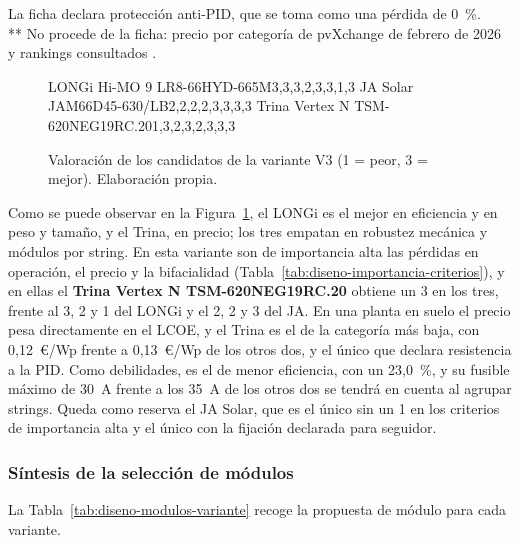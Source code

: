 \begin{table}[htbp]
    \smallskip
    {\scriptsize * La ficha declara protección anti-PID, que se toma como una pérdida de 0~\%.\\ ** No procede de la ficha: precio por categoría de pvXchange de febrero de 2026 \cite{PvXchangePrecios2026} y rankings consultados \cite{CleanEnergyReviews2025,BlackRidge2025}.}
\end{table}

\begin{figure}[htbp]
    \centering
        {LONGi Hi-MO 9 LR8-66HYD-665M}{3,3,3,2,3,3,1,3}
        {JA Solar JAM66D45-630/LB}{2,2,2,2,3,3,3,3}
        {Trina Vertex N TSM-620NEG19RC.20}{1,3,2,3,2,3,3,3}
    \caption{Valoración de los candidatos de la variante V3 (1 = peor, 3 = mejor). Elaboración propia.}
    \label{fig:radar-v3}
\end{figure}

Como se puede observar en la Figura~\ref{fig:radar-v3}, el LONGi es el mejor en eficiencia y en peso y tamaño, y el Trina, en precio; los tres empatan en robustez mecánica y módulos por string. En esta variante son de importancia alta las pérdidas en operación, el precio y la bifacialidad (Tabla~\ref{tab:diseno-importancia-criterios}), y en ellas el \textbf{Trina Vertex N TSM-620NEG19RC.20} obtiene un 3 en los tres, frente al 3, 2 y 1 del LONGi y el 2, 2 y 3 del JA. En una planta en suelo el precio pesa directamente en el \ac{LCOE}, y el Trina es el de la categoría más baja, con 0,12~€/Wp frente a 0,13~€/Wp de los otros dos, y el único que declara resistencia a la PID. Como debilidades, es el de menor eficiencia, con un 23,0~\%, y su fusible máximo de 30~A frente a los 35~A de los otros dos se tendrá en cuenta al agrupar strings. Queda como reserva el JA Solar, que es el único sin un 1 en los criterios de importancia alta y el único con la fijación declarada para seguidor.

\subsubsection{Síntesis de la selección de módulos}
\label{subsubsec:diseno-modulos-sintesis}

La Tabla~\ref{tab:diseno-modulos-variante} recoge la propuesta de módulo para cada variante.

